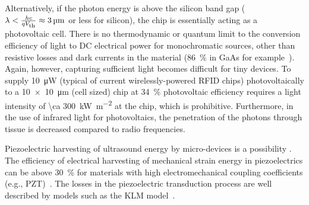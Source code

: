Alternatively, if the photon energy is above the silicon band gap ($\lambda < \frac{h c}{qV_{\text{\scriptsize th}}} \approx \SI{3}{\micro\meter}$ or less for silicon), the chip is essentially acting as a photovoltaic cell.
There is no thermodynamic or quantum limit to the conversion efficiency of light to DC electrical power for monochromatic sources, other than resistive losses and dark currents in the material (\SI{86}{\percent} in GaAs for example~\cite{bett08}). Again, however, capturing sufficient light becomes difficult for tiny devices.
To supply \SI{10}{\micro\watt} (typical of current wirelessly-powered RFID chips) photovoltaically to a \SI{10 x 10}{\micro\meter} (cell sized) chip at \SI{34}{\percent} photovoltaic efficiency requires a light intensity of \SI{\ca 300}{\kilo\watt\per\meter\squared} at the chip, which is prohibitive. Furthermore, in the use of infrared light for photovoltaics, the penetration of the photons through tissue is decreased compared to radio frequencies.

Piezoelectric harvesting of ultrasound energy by micro-devices is a possibility \cite{Seo2013}. The efficiency of electrical harvesting of mechanical strain energy in piezoelectrics can be above \SI{30}{\percent} for materials with high electromechanical coupling coefficients (e.g., PZT)~\cite{safari08, xu12}. The losses in the piezoelectric transduction process are well described by models such as the KLM model~\cite{krimholtz70,castillo03}. 

